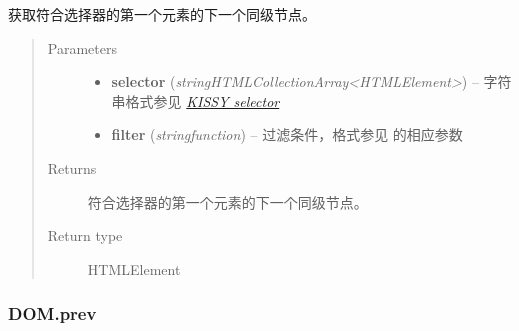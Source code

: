 \documentclass[letterpaper,10pt,english]{sphinxmanual}
\begin{document}
\begin{fulllineitems}
\label{api/core/dom/next:DOM.next}
获取符合选择器的第一个元素的下一个同级节点。
\begin{quote}\begin{description}
\item[{Parameters}] \leavevmode\begin{itemize}
\item {}
\textbf{selector} (\emph{string\textbar{}HTMLCollection\textbar{}Array\textless{}HTMLElement\textgreater{}}) -- 字符串格式参见 {\hyperref[api/core/dom/selector:dom-selector]{\emph{KISSY selector}}}

\item {}
\textbf{filter} (\emph{string\textbar{}function}) -- 过滤条件，格式参见 {\hyperref[api/core/dom/filter:DOM.filter]{}} 的相应参数

\end{itemize}

\item[{Returns}] \leavevmode
符合选择器的第一个元素的下一个同级节点。

\item[{Return type}] \leavevmode
HTMLElement

\end{description}\end{quote}

\end{fulllineitems}



\subsubsection{DOM.prev}
\label{api/core/dom/prev:dom-prev}\label{api/core/dom/prev::doc}
\end{document}
